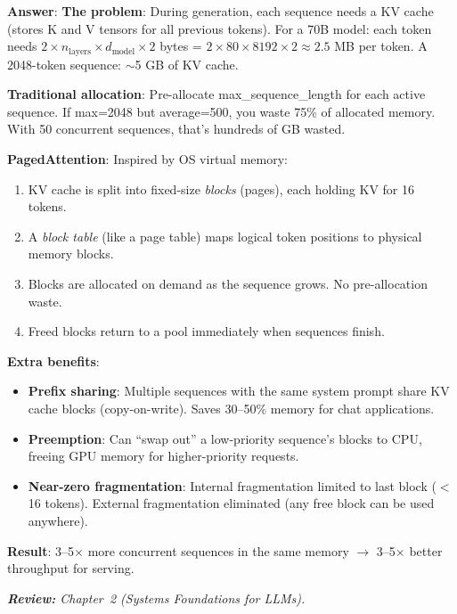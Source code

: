 \begin{questionbox}
\textbf{Answer}: \textbf{The problem}: During generation, each sequence needs a KV cache (stores K and V tensors for all previous tokens). For a 70B model: each token needs $2 \times n_\text{layers} \times d_\text{model} \times 2$ bytes = $2 \times 80 \times 8192 \times 2 \approx 2.5$ MB per token. A 2048-token sequence: $\sim$5 GB of KV cache.

\textbf{Traditional allocation}: Pre-allocate max\_sequence\_length for each active sequence. If max=2048 but average=500, you waste 75\% of allocated memory. With 50 concurrent sequences, that’s hundreds of GB wasted.

\textbf{PagedAttention}: Inspired by OS virtual memory:

\begin{enumerate}
  \item KV cache is split into fixed-size \emph{blocks} (pages), each holding KV for 16 tokens.
  \item A \emph{block table} (like a page table) maps logical token positions to physical memory blocks.
  \item Blocks are allocated on demand as the sequence grows. No pre-allocation waste.
  \item Freed blocks return to a pool immediately when sequences finish.
\end{enumerate}

\textbf{Extra benefits}:

\begin{itemize}
  \item \textbf{Prefix sharing}: Multiple sequences with the same system prompt share KV cache blocks (copy-on-write). Saves 30--50\% memory for chat applications.
  \item \textbf{Preemption}: Can ``swap out'' a low-priority sequence’s blocks to CPU, freeing GPU memory for higher-priority requests.
  \item \textbf{Near-zero fragmentation}: Internal fragmentation limited to last block ($<$16 tokens). External fragmentation eliminated (any free block can be used anywhere).
\end{itemize}

\textbf{Result}: 3--5$\times$ more concurrent sequences in the same memory $\rightarrow$ 3--5$\times$ better throughput for serving.

\emph{\textbf{Review:} Chapter~2 (Systems Foundations for LLMs).}
\end{questionbox}

